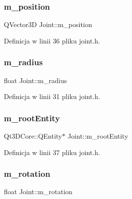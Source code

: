 \subsubsection{\texorpdfstring{m\+\_\+position}{m\_position}}
{\footnotesize\ttfamily Q\+Vector3D Joint\+::m\+\_\+position\hspace{0.3cm}{\ttfamily [protected]}}



Definicja w linii 36 pliku joint.\+h.

\mbox{\label{class_joint_a0badff470b9c02646557b848b12157bb}} 
\subsubsection{\texorpdfstring{m\+\_\+radius}{m\_radius}}
{\footnotesize\ttfamily float Joint\+::m\+\_\+radius\hspace{0.3cm}{\ttfamily [protected]}}



Definicja w linii 31 pliku joint.\+h.

\mbox{\label{class_joint_aee7172c3678a1cb2fb916f5cd3768a9b}} 
\subsubsection{\texorpdfstring{m\+\_\+root\+Entity}{m\_rootEntity}}
{\footnotesize\ttfamily Qt3\+D\+Core\+::\+Q\+Entity$\ast$ Joint\+::m\+\_\+root\+Entity\hspace{0.3cm}{\ttfamily [protected]}}



Definicja w linii 37 pliku joint.\+h.

\mbox{\label{class_joint_a60e475f7439a1bae1ce859de007d3e84}} 
\subsubsection{\texorpdfstring{m\+\_\+rotation}{m\_rotation}}
{\footnotesize\ttfamily float Joint\+::m\+\_\+rotation\hspace{0.3cm}{\ttfamily [protected]}}




